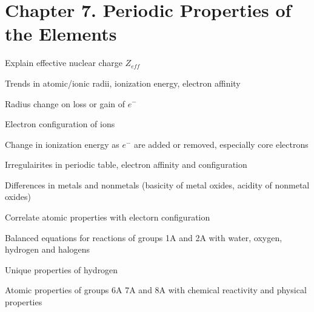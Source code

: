 \section{Chapter 7. Periodic Properties of the Elements}

\secttoc

{\footnotesize
\begin{multicols}{3}
\begin{compactenum}
    \item Explain effective nuclear charge $Z_{eff}$
    \item Trends in atomic/ionic radii, ionization energy, electron affinity
    \item Radius change on loss or gain of $e^-$
    \item Electron configuration of ions
    \item Change in ionization energy as $e^-$ are added or removed, especially
        core electrons
    \item Irregulairites in periodic table, electron affinity and configuration
    \item Differences in metals and nonmetals (basicity of metal oxides,
        acidity of nonmetal oxides)
    \item Correlate atomic properties with electorn configuration
    \item Balanced equations for reactions of groups 1A and 2A with water,
        oxygen, hydrogen and halogens
    \item Unique properties of hydrogen
    \item Atomic properties of groups 6A 7A and 8A with chemical reactivity
        and physical properties
\end{compactenum}
\end{multicols}
}



